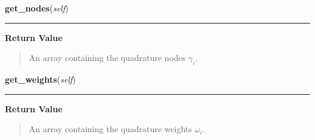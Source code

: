     \vspace{0.5ex}

\hspace{.8\funcindent}\begin{boxedminipage}{\funcwidth}

    \raggedright \textbf{get\_nodes}(\textit{self})

    \vspace{-1.5ex}

    \rule{\textwidth}{0.5\fboxrule}
\setlength{\parskip}{2ex}
\setlength{\parskip}{1ex}
      \textbf{Return Value}
    \vspace{-1ex}

      \begin{quote}
      An array containing the quadrature nodes $\gamma_i$.

      \end{quote}

    \end{boxedminipage}

    \label{Quadrator:Quadrator:get_weights}

    \vspace{0.5ex}

\hspace{.8\funcindent}\begin{boxedminipage}{\funcwidth}

    \raggedright \textbf{get\_weights}(\textit{self})

    \vspace{-1.5ex}

    \rule{\textwidth}{0.5\fboxrule}
\setlength{\parskip}{2ex}
\setlength{\parskip}{1ex}
      \textbf{Return Value}
    \vspace{-1ex}

      \begin{quote}
      An array containing the quadrature weights $\omega_i$.

      \end{quote}

    \end{boxedminipage}

    \label{Quadrator:Quadrator:hermite_recursion}

    \vspace{0.5ex}

